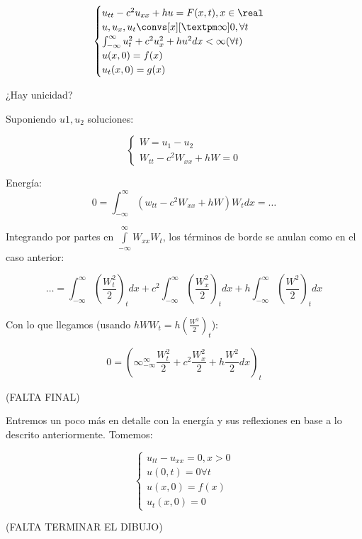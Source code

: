 			\begin{problem}

				\[\begin{cases}
					u_{tt} - c^2 u_{xx} + hu = F(x,t), x \in \real \\
					u, u_x, u_t \convs[x][±\infty] 0, \forall t\\
					\int_{-\infty}^\infty u_t^2 + c^2 u_x^2 + hu^2 dx < \infty (\forall t) \\
					u(x,0) = f(x) \\
					u_t(x,0) = g(x)
				\end{cases}\]

				¿Hay unicidad?

				\solution

				Suponiendo $u1,u_2$ soluciones:

				\[\begin{cases}
					W = u_1 - u_2 \\
					W_{tt} - c^2 W_{xx} + h W = 0
				\end{cases}\]

				Energía:
				\[ 0 = \int_{-\infty}^\infty (w_{tt} - c^2 W_{xx} + h W)W_t dx = … \]

				Integrando por partes en $\int\limits_{-\infty}^\infty W_{xx} W_{t}$, los términos de borde se anulan como en el caso anterior:

				\[ … = \int_{-\infty}^{\infty}  (\frac{W_t^2}{2})_t dx + c^2 \int_{-\infty}^\infty (\frac{W_x^2}{2})_t dx + h \int_{-\infty}^\infty (\frac{W^2}{2})_t dx \]

				Con lo que llegamos (usando $hWW_t = h (\frac{W^2}{2})_t$):

				\[ 0 = (\infty_{-\infty}^\infty  \frac{W_t^2}{2} + c^2 \frac{W_x^2}{2} + h \frac{W^2}{2} dx)_t\]

				(FALTA FINAL)


			\end{problem}


			Entremos un poco más en detalle con la energía y sus reflexiones en base a lo descrito anteriormente. Tomemos:

			\[\begin{cases}
				u_{tt} - u_{xx} = 0, x > 0 \\
				u(0,t) = 0 \forall t \\
				u(x,0) = f(x) \\
				u_t(x,0) = 0
			\end{cases}\]

			(FALTA TERMINAR EL DIBUJO)

